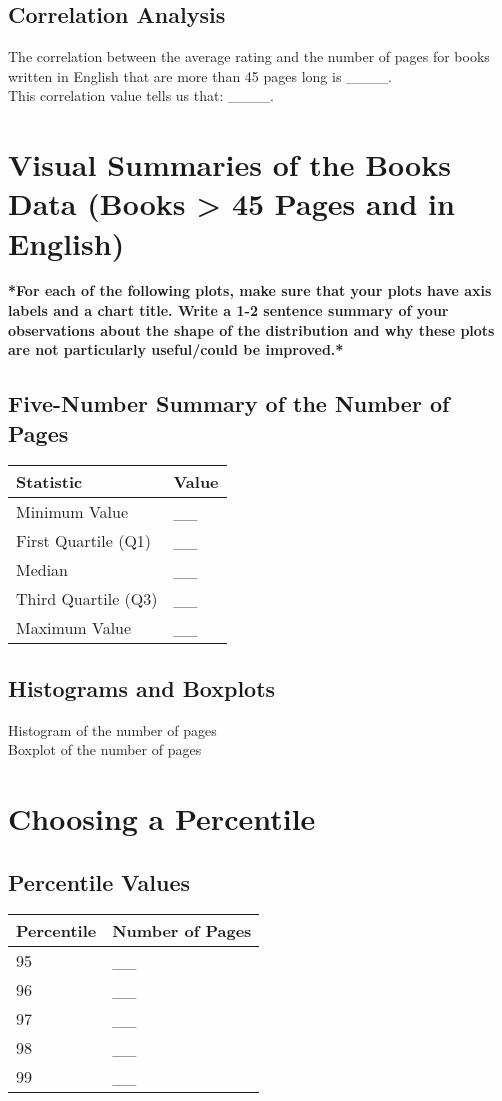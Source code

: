 \documentclass[12pt]{article}
\begin{document}
\subsection*{Correlation Analysis}
The correlation between the average rating and the number of pages for books written in English that are more than 45 pages long is \_\_\_\_. \\ 

{This correlation value tells us that:} \_\_\_\_.

\section*{Visual Summaries of the Books Data (Books > 45 Pages and in English)}

\textbf{*For each of the following plots, make sure that your plots have axis labels and a chart title. Write a 1-2 sentence summary of your observations about the shape of the distribution and why these plots are not particularly useful/could be improved.*}

\subsection*{Five-Number Summary of the Number of Pages}
\begin{tabular}{l l}
    \toprule
    \textbf{Statistic} & \textbf{Value} \\
    \midrule
    Minimum Value & \_\_ \\
    First Quartile (Q1) & \_\_ \\
    Median & \_\_ \\
    Third Quartile (Q3) & \_\_ \\
    Maximum Value & \_\_ \\
    \bottomrule
\end{tabular}

\subsection*{Histograms and Boxplots}
{Histogram of the number of pages}\\

{Boxplot of the number of pages}

\section*{Choosing a Percentile}
\subsection*{Percentile Values}
\begin{tabular}{l l}
    \toprule
    \textbf{Percentile} & \textbf{Number of Pages} \\
    \midrule
    95 & \_\_ \\
    96 & \_\_ \\
    97 & \_\_ \\
    98 & \_\_ \\
    99 & \_\_ \\
    \bottomrule
\end{tabular}
\end{document}
